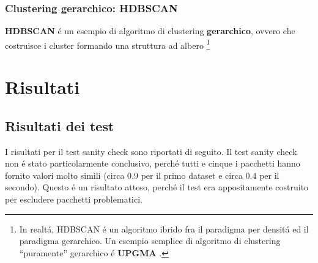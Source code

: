 \documentclass[12pt]{report}
\begin{document}
			\subsection{Clustering gerarchico: HDBSCAN}

				\textbf{HDBSCAN} é un esempio di algoritmo di clustering
				\textbf{gerarchico}, ovvero che costruisce i cluster formando
				una struttura ad albero \footnote{In realtá, HDBSCAN é un
				algoritmo ibrido fra il paradigma per densitá ed il paradigma
				gerarchico. Un esempio semplice di algoritmo di clustering
				``puramente'' gerarchico é \textbf{UPGMA} \cite{Sokal1958ASM}.}

	\chapter{Risultati}

		\section{Risultati dei test}

			I risultati per il test sanity check sono riportati di seguito.
			Il test sanity check non é stato particolarmente conclusivo,
			perché tutti e cinque i pacchetti hanno fornito valori molto
			simili (circa $0.9$ per il primo dataset e circa $0.4$ per il
			secondo). Questo é un risultato atteso, perché il test era
			appositamente costruito per escludere pacchetti problematici.
\end{document}
